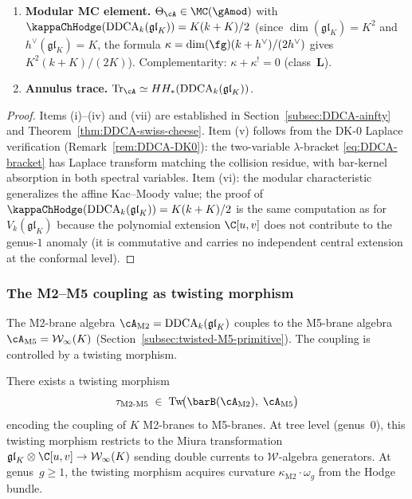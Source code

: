 \begin{theorem}
\begin{enumerate}[label=\textup{(\roman*)},nosep]
\item \textbf{Modular MC element.}
 $\Theta_\cA \in \MC(\gAmod)$ with
 $\kappaChHodge(\mathrm{DDCA}_k(\mathfrak{gl}_K)) = K(k + K)/2$
 \textup{(}since $\dim(\mathfrak{gl}_K) = K^2$ and
 $h^\vee(\mathfrak{gl}_K) = K$, the formula
 $\kappa = \dim(\fg)(k+h^\vee)/(2h^\vee)$ gives
 $K^2(k+K)/(2K)$\textup{)}. Complementarity:
 $\kappa + \kappa^! = 0$ \textup{(}class~$\mathbf{L}$\textup{)}.

\item \textbf{Annulus trace.}
 $\operatorname{Tr}_\cA \simeq HH_*(\mathrm{DDCA}_k(\mathfrak{gl}_K))$.
\end{enumerate}
\end{theorem}

\begin{proof}
Items (i)--(iv) and (vii) are established in
Section~\ref{subsec:DDCA-ainfty} and
Theorem~\ref{thm:DDCA-swiss-cheese}.
Item (v) follows from the DK-0 Laplace verification
(Remark~\ref{rem:DDCA-DK0}): the two-variable $\lambda$-bracket
\eqref{eq:DDCA-bracket} has Laplace transform matching the
collision residue, with bar-kernel absorption in both spectral
variables.
Item (vi): the modular characteristic generalizes the affine
Kac--Moody value; the proof of
$\kappaChHodge(\mathrm{DDCA}_k(\mathfrak{gl}_K)) = K(k + K)/2$ is the
same computation as for $V_k(\mathfrak{gl}_K)$ because the
polynomial extension $\C[u,v]$ does not contribute to the
genus-$1$ anomaly (it is commutative and carries no independent
central extension at the conformal level).
\end{proof}

\subsubsection{The M2--M5 coupling as twisting morphism}

The M2-brane algebra $\cA_{\mathrm{M2}} = \mathrm{DDCA}_k(\mathfrak{gl}_K)$
couples to the M5-brane algebra
$\cA_{\mathrm{M5}} = \mathcal{W}_\infty(K)$
(Section~\ref{subsec:twisted-M5-primitive}).
The coupling is controlled by a twisting morphism.

\begin{conjecture}
\label{conj:M2-M5-coupling}
There exists a twisting morphism
\[
\tau_{\mathrm{M2\text{-}M5}}
\;\in\;
\operatorname{Tw}\!\bigl(
\barB(\cA_{\mathrm{M2}}),\;
\cA_{\mathrm{M5}}
\bigr)
\]
encoding the coupling of $K$ M2-branes to M5-branes.
At tree level \textup{(}genus~$0$\textup{)}, this twisting
morphism restricts to the Miura transformation
$\mathfrak{gl}_K \otimes \C[u,v] \to \mathcal{W}_\infty(K)$
sending double currents to $\mathcal{W}$-algebra generators.
At genus~$g \ge 1$, the twisting morphism acquires curvature
$\kappa_{\mathrm{M2}} \cdot \omega_g$ from the Hodge bundle.
\end{conjecture}

